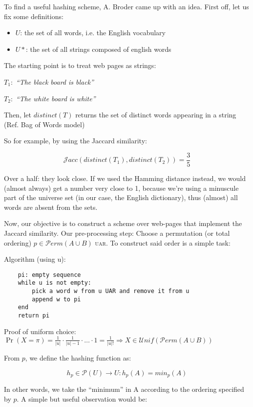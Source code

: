 \documentclass{report}
\newcommand{\unifdist}{\mathcal{U}nif}
\newcommand{\uar}{\textsc{uar}}
\newcommand{\jaccsim}{\mathcal{J}acc}
\newcommand{\permut}{\mathcal{P}erm}
\newcommand{\order}{\permut}
\begin{document}
	To find a useful hashing scheme, A. Broder came up with an idea. First off, let us fix some definitions:
	\begin{itemize}
	\item $U$: the set of all words, i.e. the English vocabulary
	\item $U*$: the set of all strings composed of english words
	\end{itemize}
	
	The starting point is to treat web pages as strings:
	
	$T_1:$ \textit{``The black board is black''}
	
	$T_2:$ \textit{``The white board is white''}
	
	Then, let $distinct(T)$ returns the set of distinct words appearing in a string (Ref. Bag of Words model)
	
	So for example, by using the Jaccard similarity:
    
    \begin{equation}
    \jaccsim(distinct(T_1), distinct(T_2))= \frac{3}{5}
    \end{equation}
	
	Over a half: they look close. If we used the Hamming distance instead, we would (almost always) get a number very close to 1, because we're using a minuscule part of the universe set (in our case, the English dictionary), thus (almost) all words are absent from the sets.
	
	Now, our objective is to construct a scheme over web-pages that implement the Jaccard similarity. Our pre-processing step: Choose a permutation (or total ordering) $p \in \order(A \cup B)$ \uar. To construct said order is a simple task:
	
	Algorithm (using u):
	\begin{verbatim}
	pi: empty sequence
	while u is not empty:
		pick a word w from u UAR and remove it from u
		append w to pi
	end
	return pi
	\end{verbatim}
	
	Proof of uniform choice: $\Pr(X = \pi) = \frac{1}{|u|}\cdot\frac{1}{|u|-1}\cdot\dots\cdot 1 = \frac{1}{|u|!} \Rightarrow X \in \unifdist(\permut(A \cup B))$
	
	From $p$, we define the hashing function as:
	
	\begin{equation}
	h_p \in \mathcal{P}(U) \to U : h_p(A) = min_p(A)
	\end{equation}
	
	In other words, we take the ``minimum'' in A according to the ordering specified by $p$. A simple but useful observation would be:
	
\end{document}
